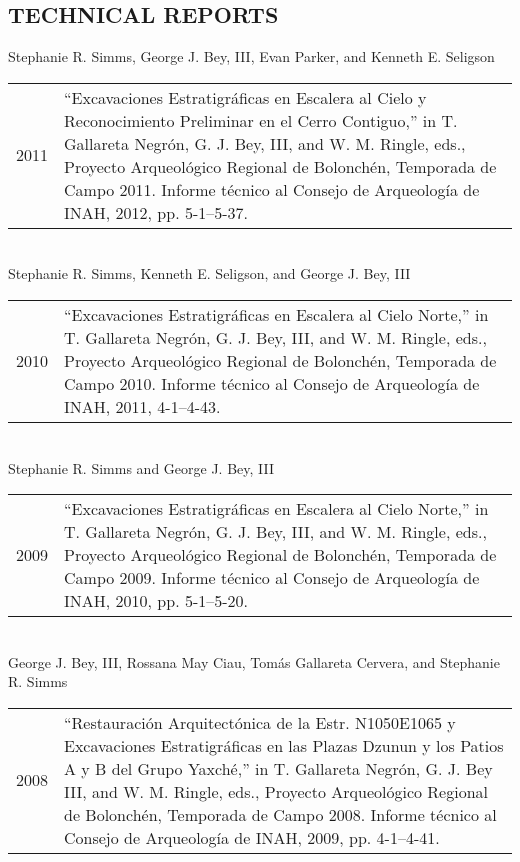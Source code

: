 \documentclass[10pt,centered]{res} %
\begin{document}
\begin{resume}
\section{\color{ResumeBlue}TECHNICAL REPORTS}
Stephanie R. Simms, George J. Bey, III, Evan Parker, and Kenneth E. Seligson\\
\begin{tabular}{p{.5in}p{5.25in}<{\raggedright\arraybackslash}}
2011 & “Excavaciones Estratigr\'{a}ficas en Escalera al Cielo y Reconocimiento Preliminar en el Cerro Contiguo,” in T. Gallareta Negr\'{o}n, G. J. Bey, III, and W. M. Ringle, eds., Proyecto Arqueol\'{o}gico Regional de Bolonch\'{e}n, Temporada de Campo 2011. Informe t\'{e}cnico al Consejo de Arqueolog\'{i}a de INAH, 2012, pp. 5-1--5-37.\\
\end{tabular}\\
Stephanie R. Simms, Kenneth E. Seligson, and George J. Bey, III\\
\begin{tabular}{p{.5in}p{5.25in}<{\raggedright\arraybackslash}}
2010 & “Excavaciones Estratigr\'{a}ficas en Escalera al Cielo Norte,” in T. Gallareta Negr\'{o}n, G. J. Bey, III, and W. M. Ringle, eds., Proyecto Arqueol\'{o}gico Regional de Bolonch\'{e}n, Temporada de Campo 2010. Informe t\'{e}cnico al Consejo de Arqueolog\'{i}a de INAH, 2011, 4-1--4-43.\\
\end{tabular}\\
Stephanie R. Simms and George J. Bey, III \\
\begin{tabular}{p{.5in}p{5.25in}<{\raggedright\arraybackslash}}
2009 & “Excavaciones Estratigr\'{a}ficas en Escalera al Cielo Norte,” in T. Gallareta Negr\'{o}n, G. J. Bey, III, and W. M. Ringle, eds., Proyecto Arqueol\'{o}gico Regional de Bolonch\'{e}n, Temporada de Campo 2009. Informe t\'{e}cnico al Consejo de Arqueolog\'{i}a de INAH, 2010, pp. 5-1--5-20.\\
\end{tabular}\\
George J. Bey, III, Rossana May Ciau, Tom\'{a}s Gallareta Cervera, and Stephanie R. Simms \\
\begin{tabular}{p{.5in}p{5.25in}<{\raggedright\arraybackslash}}
2008 & “Restauraci\'{o}n Arquitect\'{o}nica de la Estr. N1050E1065 y Excavaciones Estratigr\'{a}ficas en las Plazas Dzunun y los Patios A y B del Grupo Yaxch\'{e},” in T. Gallareta Negr\'{o}n, G. J. Bey III, and W. M. Ringle, eds., Proyecto Arqueol\'{o}gico Regional de Bolonch\'{e}n, Temporada de Campo 2008. Informe t\'{e}cnico al Consejo de Arqueolog\'{i}a de INAH, 2009, pp. 4-1--4-41. \\

\end{tabular}
\end{resume}
\end{document}
